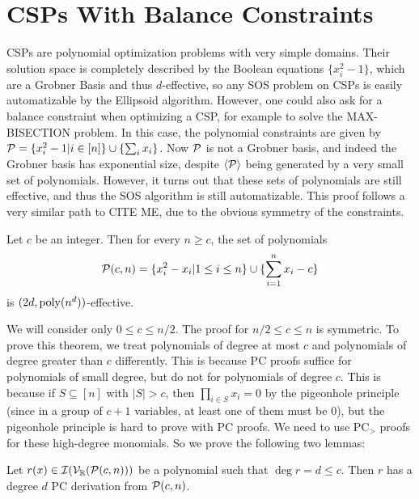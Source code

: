 \section{CSPs With Balance Constraints}\label{sec:balance}
CSPs are polynomial optimization problems with very simple domains. Their solution space is completely described by the Boolean equations $\{x_i^2 - 1\}$, which are a Grobner Basis and thus $d$-effective, so any SOS problem on CSPs is easily automatizable by the Ellipsoid algorithm. However, one could also ask for a balance constraint when optimizing a CSP, for example to solve the MAX-BISECTION problem. In this case, the polynomial constraints are given by $\mathcal P = \{x_i^2 - 1 | i \in [n]\} \cup \{\sum_i x_i\}$. Now $\mathcal P$ is not a Grobner basis, and indeed the Grobner basis has exponential size, despite $\langle \mathcal P\rangle$ being generated by a very small set of polynomials. However, it turns out that these sets of polynomials are still effective, and thus the SOS algorithm is still automatizable. This proof follows a very similar path to CITE ME, due to the obvious symmetry of the constraints. 
\begin{theorem}
Let $c$ be an integer. Then for every $n \geq c$, the set of polynomials
\[\mathcal P(c,n) = \{x_i^2 - x_i | 1 \leq i \leq n\} \cup \{\sum_{i=1}^n x_i - c\}\]
is $(2d, \operatorname{poly}(n^d))$-effective.
\end{theorem}
We will consider only $0 \leq c \leq n/2$. The proof for $n/2 \leq c \leq n$ is symmetric. To prove this theorem, we treat polynomials of degree at most $c$ and polynomials of degree greater than $c$ differently. This is because PC proofs suffice for polynomials of small degree, but do not for polynomials of degree $c$. This is because if $S \subseteq [n]$ with $|S| > c$, then $\prod_{i \in S} x_i = 0$ by the pigeonhole principle (since in a group of $c+1$ variables, at least one of them must be $0$), but the pigeonhole principle is hard to prove with PC proofs. We need to use PC$_>$ proofs for these high-degree monomials. So we prove the following two lemmas:
\begin{lemma}\label{lem:lowdeg}
Let $r(x) \in \mathcal I(\mathcal V_\mathbb R(\mathcal P(c,n)))$ be a polynomial such that $\deg r = d \leq c$. Then $r$ has a degree $d$ PC derivation from $\mathcal P(c,n)$. 
\end{lemma}
